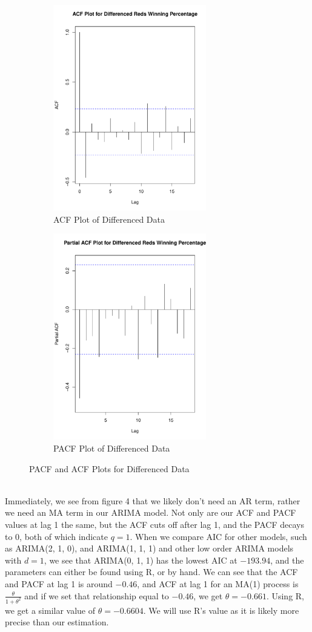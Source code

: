 \documentclass[12pt]{article}
\begin{document}
\begin{figure}[h]
\begin{subfigure}{0.5\textwidth}
\includegraphics[width=0.9\linewidth, height=9cm]{dacf.pdf} 
\caption{ACF Plot of Differenced Data}
\label{fig:subim1}
\end{subfigure}
\begin{subfigure}{0.5\textwidth}
\includegraphics[width=0.9\linewidth, height=9cm]{dpacf.pdf}
\caption{PACF Plot of Differenced Data}
\label{fig:subim2}
\end{subfigure}
\caption{PACF and ACF Plots for Differenced Data}
\label{fig:Figure 4}
\end{figure}\\
Immediately, we see from figure 4 that we likely don't need an AR term, rather we need an MA term in our ARIMA model. Not only are our ACF and PACF values at lag 1 the same, but the ACF cuts off after lag 1, and the PACF decays to 0, both of which indicate \(q = 1\). When we compare AIC for other models, such as ARIMA(2, 1, 0), and ARIMA(1, 1, 1) and other low order ARIMA models with \(d = 1\), we see that ARIMA(0, 1, 1) has the lowest AIC at \(-193.94\), and the parameters can either be found using R, or by hand. We can see that the ACF and PACF at lag 1 is around \(-0.46\), and ACF at lag 1 for an MA(1) process is \(\frac{\theta}{1 + \theta^2}\) and if we set that relationship equal to \(-0.46\), we get \(\theta = -0.661\). Using R, we get a similar value of \(\theta = -0.6604\). We will use R's value as it is likely more precise than our estimation.\\
\end{document}
